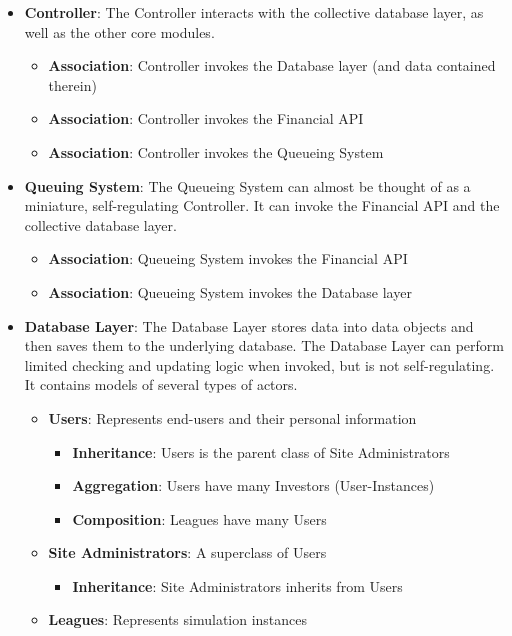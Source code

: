 \begin{itemize}
\item \textbf{Controller}: The Controller interacts with the collective database layer, 
as well as the other core modules.
	\begin{itemize}
	\item \textbf{Association}: Controller invokes the Database layer (and data contained therein)
	\item \textbf{Association}: Controller invokes the Financial API 
	\item \textbf{Association}: Controller invokes the Queueing System
	\end{itemize}
\item \textbf{Queuing System}: The Queueing System can almost be thought of as a 
miniature, self-regulating Controller. It can invoke the Financial API and the 
collective database layer.
	\begin{itemize}
	\item \textbf{Association}: Queueing System invokes the Financial API
	\item \textbf{Association}: Queueing System invokes the Database layer
	\end{itemize}
\item \textbf{Database Layer}: The Database Layer stores data into data objects and then
saves them to the underlying database. The Database Layer can perform limited checking
and updating logic when invoked, but is not self-regulating. It contains models of
several types of actors.
	\begin{itemize}
	\item \textbf{Users}: Represents end-users and their personal information
		\begin{itemize}
		\item \textbf{Inheritance}: Users is the parent class of Site Administrators
		\item \textbf{Aggregation}: Users have many Investors (User-Instances)
		\item \textbf{Composition}: Leagues have many Users
		\end{itemize}
	\item \textbf{Site Administrators}: A superclass of Users
		\begin{itemize}
		\item \textbf{Inheritance}: Site Administrators inherits from Users
		\end{itemize}
	\item \textbf{Leagues}: Represents simulation instances

\end{itemize}
\end{itemize}
